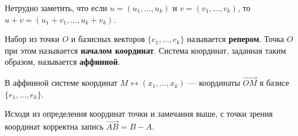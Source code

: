 Нетрудно заметить, что если $u = (u_1, \ldots, u_k)$ и $v = (v_1, \ldots, v_k)$, то $u + v = (u_1 + v_1, \ldots, u_k + v_k)$.

\begin{definition}
    Набор из точки $O$ и базисных векторов $\{e_1, \ldots, e_k\}$ называется \textbf{репером}. Точка $O$ при этом называется \textbf{началом координат}. Система координат, заданная таким образом, называется \textbf{аффинной}.
\end{definition}

\begin{definition}
    В аффинной системе координат $M \leftrightarrow (x_1, \ldots, x_k)$ --- координаты $\overrightarrow{OM}$ в базисе $\{e_1, \ldots, e_k\}$.
\end{definition}

Исходя из определения координат точки и замечания выше, с точки зрения координат корректна запись $\overrightarrow{AB} = B - A$.

